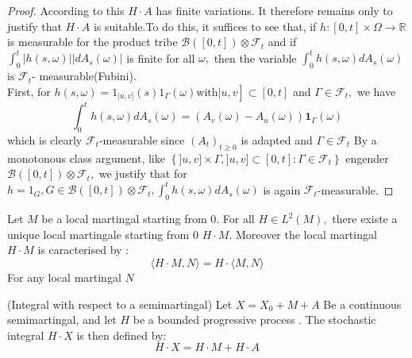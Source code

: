 	\begin{proof}
		According to this $H \cdot A $ has finite variations. It therefore remains only to justify that $ H \cdot A $ is suitable.To do this, it suffices to see that, if $ h: [0, t] \times \Omega \rightarrow \mathbb{R} $ is measurable for the product tribe $ \mathcal{B} ([0, t]) \otimes \mathcal{F} _ {t} $ and if $ \int_ {0}^{t} | h (s, \omega) | \left | dA_ {s} (\omega) \right | $ is finite for all $ \omega, $ then the variable $ \int_ {0}^{t} h (s, \omega) d A_ {s} (\omega) $ is $ \mathcal{F}_{t}$-
		measurable(Fubini).\\
		First, for $ \left.h (s, \omega) = 1_ {| u, v]} (s) 1_ {\Gamma} (\omega) \text {with} | u, v \right] \subset [0, t] $ and $ \Gamma \in \mathcal{F}_{t}, $ we have
		$$
		\int_{0}^{t} h(s, \omega)dA_ {s} (\omega) = \left (A_ {v}(\omega)-A_{u}(\omega) \right) \mathbf{1}_{\Gamma} (\omega)
		$$
		which is clearly $ \mathcal{F}_{t}$-measurable since $\left(A_{t}\right)_{t \geq 0} $ is adapted and $ \Gamma \in \mathcal{F}_{t} $
		By a monotonous class argument, like $ \left\lbrace  ]u, v] \times \Gamma, ]u, v] \subset [0, t]: \Gamma \in \mathcal{F}_{t} \right\rbrace  $ engender $\mathcal{B}([0, t]) \otimes \mathcal{F}_{t}, $ we justify that for $h=1_ {G}, G \in \mathcal{B} ([0, t]) \otimes \mathcal{F}_{t}, \int_{0}^{t} h(s, \omega)dA_{s}(\omega)$ is
		again $\mathcal{F}_{t} $-measurable.
	\end{proof}
	\begin{theorem}
		Let $M$ be a local martingal starting from 0. For all $H \in L^{2}(M),$ there existe a unique local martingale starting from $0$ $H \cdot M .$ Moreover the local martingal $H \cdot M$ is caracterised by :
		$$
		\langle H \cdot M, N\rangle= H \cdot\langle M, N\rangle
		$$
		For any local martingal $N$
	\end{theorem}
	\begin{definition}
		(Integral with respect to a semimartingal) Let $X=X_{0}+M+A$ Be a continuous semimartingal, and let $H$ be a bounded progressive process . The stochastic integral $H \cdot X$ is then defined by:
		$$
		H \cdot X=H \cdot M+H \cdot A
		$$
	\end{definition}


